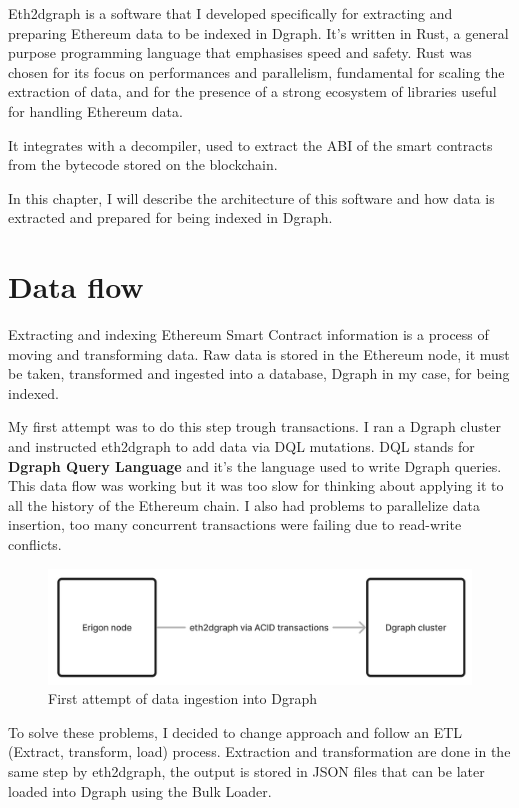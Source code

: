 
\noindent Eth2dgraph is a software that I developed specifically for extracting and preparing Ethereum data to be indexed in Dgraph. It's written in Rust, a general purpose programming language that emphasises speed and safety. Rust was chosen for its focus on performances and parallelism, fundamental for scaling the extraction of data, and for the presence of a strong ecosystem of libraries useful for handling Ethereum data.

It integrates with a decompiler, used to extract the ABI of the smart contracts from the bytecode stored on the blockchain.

In this chapter, I will describe the architecture of this software and how data is extracted and prepared for being indexed in Dgraph.

\section{Data flow}

Extracting and indexing Ethereum Smart Contract information is a process of moving and transforming data. Raw data is stored in the Ethereum node, it must be taken, transformed and ingested into a database, Dgraph in my case, for being indexed. 

My first attempt was to do this step trough transactions. I ran a Dgraph cluster and instructed eth2dgraph to add data via DQL mutations. DQL stands for \textbf{Dgraph Query Language} and it's the language used to write Dgraph queries. This data flow was working but it was too slow for thinking about applying it to all the history of the Ethereum chain. I also had problems to parallelize data insertion, too many concurrent transactions were failing due to read-write conflicts.  

\begin{figure}[H]
  \centering
  \includegraphics[width=1\textwidth]{Figures/methods/data-flow-1.jpg}
  \caption[First attempt of data ingestion into Dgraph]{First attempt of data ingestion into Dgraph}
  \label{fig:data-flow-1}
\end{figure}

To solve these problems, I decided to change approach and follow an ETL (Extract, transform, load) process. Extraction and transformation are done in the same step by eth2dgraph, the output is stored in JSON files that can be later loaded into Dgraph using the Bulk Loader.

